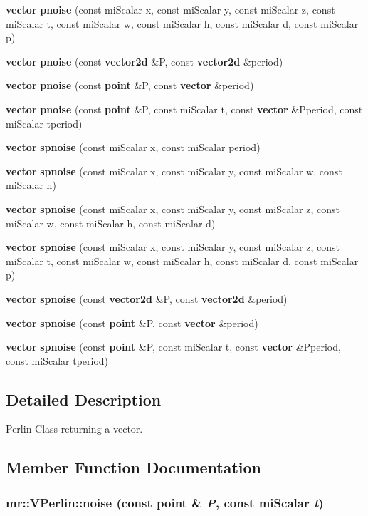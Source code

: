 \begin{CompactItemize}
\item 
{\bf vector} {\bf pnoise} (const mi\-Scalar x, const mi\-Scalar y, const mi\-Scalar z, const mi\-Scalar t, const mi\-Scalar w, const mi\-Scalar h, const mi\-Scalar d, const mi\-Scalar p)
\item 
{\bf vector} {\bf pnoise} (const {\bf vector2d} \&P, const {\bf vector2d} \&period)
\item 
{\bf vector} {\bf pnoise} (const {\bf point} \&P, const {\bf vector} \&period)
\item 
{\bf vector} {\bf pnoise} (const {\bf point} \&P, const mi\-Scalar t, const {\bf vector} \&Pperiod, const mi\-Scalar tperiod)
\item 
{\bf vector} {\bf spnoise} (const mi\-Scalar x, const mi\-Scalar period)
\item 
{\bf vector} {\bf spnoise} (const mi\-Scalar x, const mi\-Scalar y, const mi\-Scalar w, const mi\-Scalar h)
\item 
{\bf vector} {\bf spnoise} (const mi\-Scalar x, const mi\-Scalar y, const mi\-Scalar z, const mi\-Scalar w, const mi\-Scalar h, const mi\-Scalar d)
\item 
{\bf vector} {\bf spnoise} (const mi\-Scalar x, const mi\-Scalar y, const mi\-Scalar z, const mi\-Scalar t, const mi\-Scalar w, const mi\-Scalar h, const mi\-Scalar d, const mi\-Scalar p)
\item 
{\bf vector} {\bf spnoise} (const {\bf vector2d} \&P, const {\bf vector2d} \&period)
\item 
{\bf vector} {\bf spnoise} (const {\bf point} \&P, const {\bf vector} \&period)
\item 
{\bf vector} {\bf spnoise} (const {\bf point} \&P, const mi\-Scalar t, const {\bf vector} \&Pperiod, const mi\-Scalar tperiod)
\end{CompactItemize}


\subsection{Detailed Description}
Perlin Class returning a vector. 



\subsection{Member Function Documentation}
\subsubsection{ mr::VPerlin::noise (const {\bf point} \& {\em P}, const mi\-Scalar {\em t})\hspace{0.3cm}{\tt  [inline, static]}}\label{classmr_1_1VPerlin_e13}


